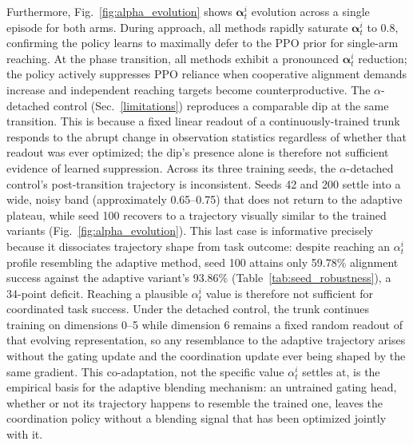 \documentclass[a4paper,fleqn]{cas-dc}
\begin{document}
Furthermore, Fig.~\ref{fig:alpha_evolution} shows $\mathbf{\alpha}^{i}_{t}$ evolution across a single episode for both arms. During approach, all methods rapidly saturate $\mathbf{\alpha}^{i}_{t}$ to 0.8, confirming the policy learns to maximally defer to the PPO prior for single-arm reaching. At the phase transition, all methods exhibit a pronounced $\mathbf{\alpha}^{i}_{t}$ reduction; the policy actively suppresses PPO reliance when cooperative alignment demands increase and independent reaching targets become counterproductive. The $\alpha$-detached control (Sec.~\ref{limitations}) reproduces a comparable dip at the same transition. This is because a fixed linear readout of a continuously-trained trunk responds to the abrupt change in observation statistics regardless of whether that readout was ever optimized; the dip's presence alone is therefore not sufficient evidence of learned suppression. Across its three training seeds, the $\alpha$-detached control's post-transition trajectory is inconsistent. Seeds 42 and 200 settle into a wide, noisy band (approximately 0.65--0.75) that does not return to the adaptive plateau, while seed 100 recovers to a trajectory visually similar to the trained variants (Fig.~\ref{fig:alpha_evolution}). This last case is informative precisely because it dissociates trajectory shape from task outcome: despite reaching an $\alpha^{i}_{t}$ profile resembling the adaptive method, seed 100 attains only 59.78\% alignment success against the adaptive variant's 93.86\% (Table~\ref{tab:seed_robustness}), a 34-point deficit. Reaching a plausible $\alpha^{i}_{t}$ value is therefore not sufficient for coordinated task success. Under the detached control, the trunk continues training on dimensions 0--5 while dimension 6 remains a fixed random readout of that evolving representation, so any resemblance to the adaptive trajectory arises without the gating update and the coordination update ever being shaped by the same gradient. This co-adaptation, not the specific value $\alpha^{i}_{t}$ settles at, is the empirical basis for the adaptive blending mechanism: an untrained gating head, whether or not its trajectory happens to resemble the trained one, leaves the coordination policy without a blending signal that has been optimized jointly with it.
\end{document}
